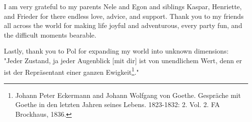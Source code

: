 I am very grateful to my parents Nele and Egon and siblings Kaspar, Henriette, and Frieder for there endless love, advice, and support.
Thank you to my friends all across the world for making life joyful and adventurous, every party fun, and the difficult moments bearable.

Lastly, thank you to Pol for expanding my world into unknown dimensions: "Jeder Zustand, ja jeder Augenblick [mit dir] ist von unendlichem Wert, denn er ist der Repr{\"a}sentant einer ganzen Ewigkeit\footnote{Johann Peter Eckermann and Johann Wolfgang von Goethe. Gespr{\"a}che mit Goethe in den letzten Jahren seines Lebens. 1823-1832: 2. Vol. 2. FA Brockhaus, 1836.}."


\endgroup
